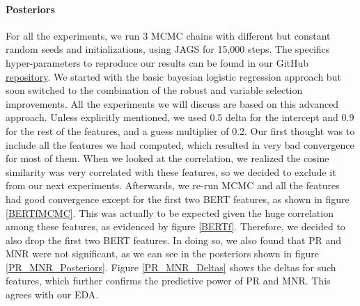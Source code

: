 \documentclass[man, floatsintext, 10pt]{apa6}
\begin{document}
\vspace{2mm}

\paragraph{Posteriors} For all the experiments, we run 3 MCMC chains with different but constant random seeds and initializations, using JAGS for 15,000 steps. The specifics hyper-parameters to reproduce our results can be found in our GitHub \href{https://github.com/seanpili/-fakesAreBAye/blob/master/RecurrentUsers/experiments.txt}{repository}. We started with the basic bayesian logistic regression approach but soon switched to the combination of the robust and variable selection improvements. All the experiments we will discuss are based on this advanced approach. Unless explicitly mentioned, we used 0.5 delta for the intercept and 0.9 for the rest of the features, and a guess multiplier of 0.2. Our first thought was to include all the features we had computed, which resulted in very bad convergence for most of them. When we looked at the correlation, we realized the cosine similarity was very correlated with these features, so we decided to exclude it from our next experiments. Afterwards, we re-run MCMC and all the features had good convergence except for the first two BERT features, as shown in figure \ref{BERTfMCMC}. This was actually to be expected given the huge correlation among these features, as evidenced by figure \ref{BERTf}. Therefore, we decided to also drop the first two BERT features. In doing so, we also found that PR and MNR were not significant, as we can see in the posteriors shown in figure \ref{PR_MNR_Posteriors}. Figure \ref{PR_MNR_Deltas} shows the deltas for such features, which further confirms the  predictive power of PR and MNR. This agrees with our EDA.
\end{document}
